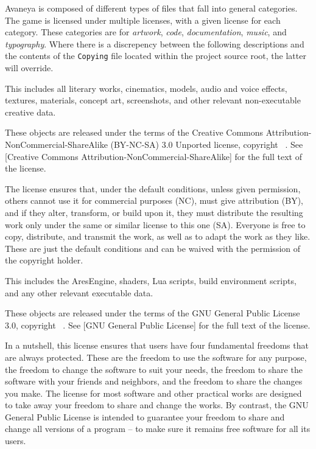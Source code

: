 

Avaneya is composed of different types of files that fall into general categories. The game is licensed under multiple licenses, with a given license for each category. These categories are for {\it artwork}, {\it code}, {\it documentation}, {\it music}, and {\it typography}. Where there is a discrepency between the following descriptions and the contents of the {\tt Copying} file located within the project source root, the latter will override.

\startitemize[4]

This includes all literary works, cinematics, models, audio and voice effects, textures, materials, concept art, screenshots, and other relevant non-executable creative data. 

These objects are released under the terms of the Creative Commons Attribution-NonCommercial-ShareAlike (BY-NC-SA) 3.0 Unported license, copyright \CopyrightDates\ \CopyrightHolder. See [Creative Commons Attribution-NonCommercial-ShareAlike] for the full text of the license.

The license ensures that, under the default conditions, unless given permission, others cannot use it for commercial purposes (NC), must give attribution (BY), and if they alter, transform, or build upon it, they must distribute the resulting work only under the same or similar license to this one (SA). Everyone is free to copy, distribute, and transmit the work, as well as to adapt the work as they like. These are just the default conditions and can be waived with the permission of the copyright holder.


This includes the AresEngine, shaders, Lua scripts, build environment scripts, and any other relevant executable data.

These objects are released under the terms of the GNU General Public License 3.0, copyright \CopyrightDates\ \CopyrightHolder. See [GNU General Public License] for the full text of the license.

In a nutshell, this license ensures that users have four fundamental freedoms that are always protected. These are the freedom to use the software for any purpose, the freedom to change the software to suit your needs, the freedom to share the software with your friends and neighbors, and the freedom to share the changes you make. The license for most software and other practical works are designed to take away your freedom to share and change the works. By contrast, the GNU General Public License is intended to guarantee your freedom to share and change all versions of a program -- to make sure it remains free software for all its users.

